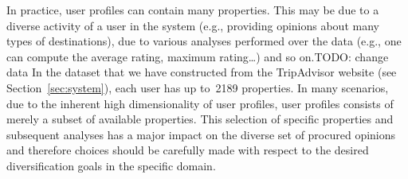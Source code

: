 In practice, user profiles can contain many properties. This may be due to a diverse activity of a user in the system (e.g., providing opinions about many types of destinations), %
due to various analyses performed over the data (e.g., one can compute the average rating, maximum rating\dots) and so on.TODO: change data In the dataset that we have constructed from the TripAdvisor website (see Section~\ref{sec:system}), each user has up to~2189 properties. In many scenarios, due to the inherent high dimensionality of user profiles, user profiles consists of merely a subset of available properties. This selection of specific properties and subsequent analyses has a major impact on the diverse set of procured opinions and therefore choices should be carefully made with respect to the desired diversification goals in the specific domain.
